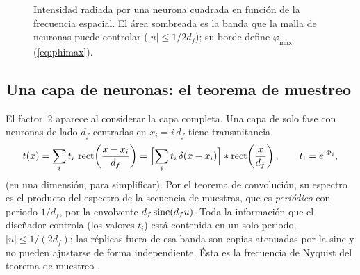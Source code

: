 \begin{figure}[htb]
\centering
{}
\caption[Patrón de difracción de una neurona]{Intensidad radiada por una neurona cuadrada
en función de la frecuencia espacial. El área sombreada es la banda que la malla de
neuronas puede controlar ($|u|\le1/2d_f$); su borde define $\varphi_{\max}$ (\cref{eq:phimax}).}
\label{fig:sinc}
\end{figure}

\subsection{Una capa de neuronas: el teorema de muestreo}

El factor~2 aparece al considerar la capa completa. Una capa de solo fase con neuronas de
lado $d_f$ centradas en $x_i=i\,d_f$ tiene transmitancia
\begin{equation}
  t(x)=\sum_i t_i\,\operatorname{rect}\!\left(\frac{x-x_i}{d_f}\right)
      =\Bigl[\sum_i t_i\,\delta(x-x_i)\Bigr]*\operatorname{rect}\!\left(\frac{x}{d_f}\right),
  \qquad t_i=e^{\mathrm{j}\Phi_i},
  \label{eq:capa-muestreada}
\end{equation}
(en una dimensión, para simplificar). Por el teorema de convolución, su espectro es el
producto del espectro de la secuencia de muestras, que es \emph{periódico} con periodo
$1/d_f$, por la envolvente $d_f\operatorname{sinc}(d_fu)$. Toda la información que el diseñador controla
(los valores $t_i$) está contenida en un solo periodo, $|u|\le1/(2d_f)$; las réplicas fuera de
esa banda son copias atenuadas por la sinc y no pueden ajustarse de forma independiente.
Ésta es la frecuencia de Nyquist del teorema de muestreo \parencite{shannon1949}.

